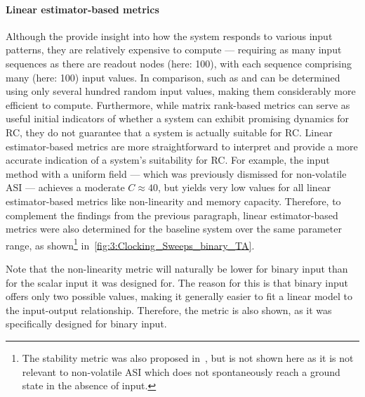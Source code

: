 \paragraph{Linear estimator-based metrics}
Although the  provide insight into how the system responds to various input patterns, they are relatively expensive to compute --- requiring as many input sequences as there are readout nodes (here: 100), with each sequence comprising many (here: 100) input values.
In comparison,  such as  and  can be determined using only several hundred random input values, making them considerably more efficient to compute.
Furthermore, while matrix rank-based metrics can serve as useful initial indicators of whether a system can exhibit promising dynamics for RC, they do not guarantee that a system is actually suitable for RC.
Linear estimator-based metrics are more straightforward to interpret and provide a more accurate indication of a system's suitability for RC.
For example, the input method with a uniform field --- which was previously dismissed for non-volatile ASI --- achieves a moderate $C \approx 40$, but yields very low values for all linear estimator-based metrics like non-linearity and memory capacity. %
Therefore, to complement the findings from the previous paragraph, linear estimator-based metrics were also determined for the baseline system over the same parameter range, as shown\footnote{
	The stability metric was also proposed in~\cite{RC_TaskAgnosticMetrics_v2}, but is not shown here as it is not relevant to non-volatile ASI which does not spontaneously reach a ground state in the absence of input.
} in~\cref{fig:3:Clocking_Sweeps_binary_TA}. \par
Note that the non-linearity metric will naturally be lower for binary input than for the scalar input it was designed for.
The reason for this is that binary input offers only two possible values, making it generally easier to fit a linear model to the input-output relationship.
Therefore, the  metric is also shown, as it was specifically designed for binary input. %


